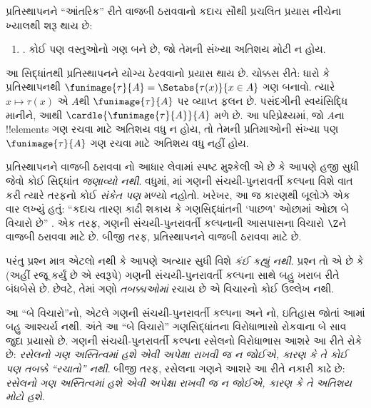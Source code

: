 \documentclass[../../../include/open-logic-section]{subfiles}
\begin{document}

પ્રતિસ્થાપનને ``આંતરિક'' રીતે વાજબી ઠરાવવાનો કદાચ સૌથી
પ્રચલિત પ્રયાસ નીચેના ખ્યાલથી શરૂ થાય છે:
\begin{enumerate}
	\item[] \limofsize. કોઈ પણ વસ્તુઓનો ગણ બને છે,
	જો તેમની સંખ્યા અતિશય મોટી ન હોય.
\end{enumerate}
આ સિદ્ધાંતથી પ્રતિસ્થાપનને યોગ્ય ઠેરવવાનો પ્રયાસ થાય છે.
ચોક્કસ રીતે: ધારો કે પ્રતિસ્થાપનથી
$\funimage{\tau}{A} = \Setabs{\tau(x)}{x \in A}$ ગણ
બનાવો. ત્યારે $x \mapsto \tau(x)$ એ $A$થી
$\funimage{\tau}{A}$ પર વ્યાપ્ત ફલન છે.
પસંદગીની સ્વયંસિદ્ધિ માનીને, આથી
$\cardle{\funimage{\tau}{A}}{A}$ મળે છે. આ પરિપ્રેક્ષ્યમાં,
જો $A$ના !!{element}s ગણ રચવા માટે અતિશય વધુ ન હોય,
તો તેમની પ્રતિમાઓની સંખ્યા પણ $\funimage{\tau}{A}$ ગણ
રચવા માટે અતિશય વધુ નહીં હોય.

પ્રતિસ્થાપનને વાજબી ઠરાવવા \limofsize{}નો આધાર
લેવામાં સ્પષ્ટ મુશ્કેલી એ છે કે આપણે હજી સુધી
\limofsize{} જેવો કોઈ સિદ્ધાંત \emph{જણાવ્યો નથી}.
વધુમાં, માં
ગણની સંચયી-પુનરાવર્તી કલ્પના વિશે વાત કરી ત્યારે
\limofsize{} તરફનો કોઈ \emph{સંકેત પણ} મળ્યો નહોતો.
ખરેખર, આ જ કારણથી બૂલોઝે એક વાર લખ્યું હતું:
``કદાચ તારણ કાઢી શકાય કે ગણસિદ્ધાંતની `પાછળ' ઓછામાં
ઓછા બે વિચારો છે'' \citeyearpar[p.~19]{Boolos1989}.
એક તરફ, ગણની સંચયી-પુનરાવર્તી કલ્પનાની આસપાસના
વિચારો $\Z$ને વાજબી ઠરાવવા માટે છે. બીજી તરફ,
\limofsize{} પ્રતિસ્થાપનને વાજબી ઠરાવવા માટે છે.

પરંતુ પ્રશ્ન માત્ર એટલો નથી કે આપણે અત્યાર સુધી
\limofsize{} વિશે \emph{કંઈ કહ્યું નથી}. પ્રશ્ન તો
એ છે કે \limofsize{} (અહીં રજૂ કર્યું છે એ સ્વરૂપે)
ગણની સંચયી-પુનરાવર્તી કલ્પના સાથે બહુ ખરાબ રીતે
બંધબેસે છે. છેવટે, તેમાં ગણો \emph{તબક્કાઓમાં}
રચાય છે એ વિચારનો કોઈ ઉલ્લેખ નથી.

આ ``બે વિચારો''નો, એટલે ગણની સંચયી-પુનરાવર્તી
કલ્પના અને \limofsize{}નો, ઇતિહાસ જોતાં આમાં
બહુ આશ્ચર્ય નથી. અંતે આ ``બે વિચારો'' ગણસિદ્ધાંતના
વિરોધાભાસો રોકવાના બે સાવ જુદા પ્રયાસો છે.
ગણની સંચયી-પુનરાવર્તી કલ્પના રસેલનો વિરોધાભાસ
આશરે આ રીતે રોકે છે: \emph{રસેલનો ગણ અસ્તિત્વમાં હશે
એવી અપેક્ષા રાખવી જ ન જોઈએ, કારણ કે તે કોઈ પણ
તબક્કે ``રચાતો'' નથી}. બીજી તરફ, \limofsize{}
રસેલના ગણને આશરે આ રીતે નકારી કાઢે છે:
\emph{રસેલનો ગણ અસ્તિત્વમાં હશે એવી અપેક્ષા રાખવી જ
ન જોઈએ, કારણ કે તે અતિશય મોટો હશે}.
\end{document}
